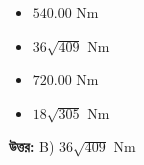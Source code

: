 \documentclass[12pt, a4paper]{article}
\begin{document}
\begin{itemize}[label={}, leftmargin=1cm, itemsep=0.5em]
\item[\textbf{A)}] $540.00\text{ Nm}$
\item[\textbf{B)}] $36\sqrt{409}\text{ Nm}$
\item[\textbf{C)}] $720.00\text{ Nm}$
\item[\textbf{D)}] $18\sqrt{305}\text{ Nm}$
\end{itemize}
\vspace{0.5em}

\begin{tcolorbox}[answerbox]
\textbf{\color{success} উত্তর:} B) $36\sqrt{409}\text{ Nm}$
\end{tcolorbox}
\vspace{1em}
\end{document}
